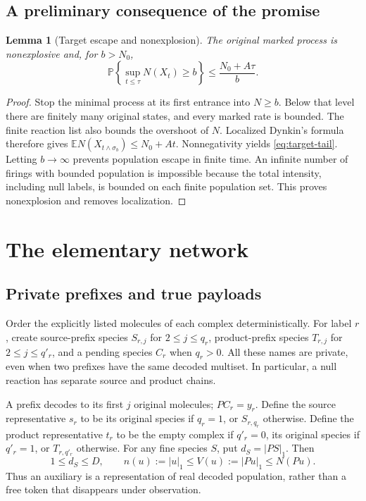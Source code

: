 \documentclass[11pt,reqno]{amsart}
\newtheorem{lemma}[theorem]{Lemma}
\theoremstyle{definition}
\theoremstyle{remark}
\newcommand{\E}{\mathbb E}
\newcommand{\Prob}{\mathbb P}
\begin{document}
\subsection{A preliminary consequence of the promise}
\begin{lemma}[Target escape and nonexplosion]\label{lem:target-tail}
The original marked process is nonexplosive and, for $b>N_0$,
\begin{equation}\label{eq:target-tail}
 \Prob\left\{\sup_{t\le\tau}N(X_t)\ge b\right\}
 \le\frac{N_0+A\tau}{b}.
\end{equation}
\end{lemma}
\begin{proof}
Stop the minimal process at its first entrance into $N\ge b$. Below that level
there are finitely many original states, and every marked rate is bounded.
The finite reaction list also bounds the overshoot of $N$. Localized Dynkin's
formula therefore gives
$\E N(X_{t\wedge\sigma_b})\le N_0+At$. Nonnegativity yields
\eqref{eq:target-tail}. Letting $b\to\infty$ prevents population escape in
finite time. An infinite number of firings with bounded population is
impossible because the total intensity, including null labels, is bounded on
each finite population set. This proves nonexplosion and removes localization.
\end{proof}



\section{The elementary network}\label{sec:network}
\subsection{Private prefixes and true payloads}
Order the explicitly listed molecules of each complex deterministically.
For label $r$, create source-prefix species $S_{r,j}$ for $2\le j\le q_r$,
product-prefix species $T_{r,j}$ for $2\le j\le q'_r$, and a pending species
$C_r$ when $q_r>0$. All these names are private, even when two prefixes have
the same decoded multiset. In particular, a null reaction has separate source
and product chains.

A prefix decodes to its first $j$ original molecules; $PC_r=y_r$. Define the
source representative $s_r$ to be its original species if $q_r=1$, or
$S_{r,q_r}$ otherwise. Define the product representative $t_r$ to be the empty
complex if $q'_r=0$, its original species if $q'_r=1$, or $T_{r,q'_r}$ otherwise.
For any fine species $S$, put $d_S=|PS|_1$. Then
\begin{equation}\label{eq:counts-order}
 1\le d_S\le D,\qquad
 n(u):=|u|_1\le V(u):=|Pu|_1\le N(Pu).
\end{equation}
Thus an auxiliary is a representation of real decoded population, rather than
a free token that disappears under observation.
\end{document}
